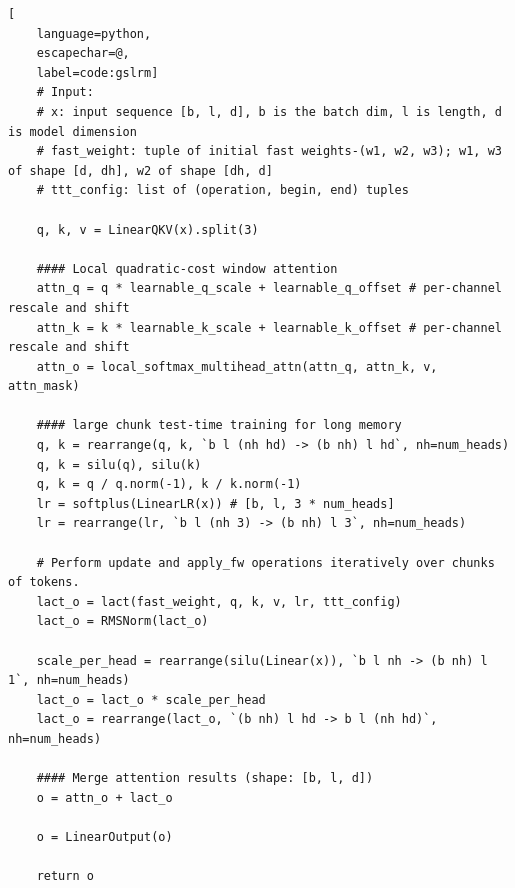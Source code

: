 \documentclass{article}
\begin{document}
\begin{algorithm}[t]

\caption{LaCT Layer with In-Layer Hybrid Window Attention Pseudocode}\label{alg:lact_hybrid}
\newcommand{\hlbox}[1]{
  \fboxsep=1.2pt\hspace*{-\fboxsep}\colorbox{blue!10}{\detokenize{#1}}
}
\lstset{style=mocov3}
\begin{lstlisting}[
    language=python,
    escapechar=@,
    label=code:gslrm]
    # Input: 
    # x: input sequence [b, l, d], b is the batch dim, l is length, d is model dimension
    # fast_weight: tuple of initial fast weights-(w1, w2, w3); w1, w3 of shape [d, dh], w2 of shape [dh, d]
    # ttt_config: list of (operation, begin, end) tuples

    q, k, v = LinearQKV(x).split(3)

    #### Local quadratic-cost window attention
    attn_q = q * learnable_q_scale + learnable_q_offset # per-channel rescale and shift
    attn_k = k * learnable_k_scale + learnable_k_offset # per-channel rescale and shift
    attn_o = local_softmax_multihead_attn(attn_q, attn_k, v, attn_mask)

    #### large chunk test-time training for long memory
    q, k = rearrange(q, k, `b l (nh hd) -> (b nh) l hd`, nh=num_heads)
    q, k = silu(q), silu(k)
    q, k = q / q.norm(-1), k / k.norm(-1)
    lr = softplus(LinearLR(x)) # [b, l, 3 * num_heads]
    lr = rearrange(lr, `b l (nh 3) -> (b nh) l 3`, nh=num_heads)

    # Perform update and apply_fw operations iteratively over chunks of tokens.
    lact_o = lact(fast_weight, q, k, v, lr, ttt_config)
    lact_o = RMSNorm(lact_o)

    scale_per_head = rearrange(silu(Linear(x)), `b l nh -> (b nh) l 1`, nh=num_heads)
    lact_o = lact_o * scale_per_head
    lact_o = rearrange(lact_o, `(b nh) l hd -> b l (nh hd)`, nh=num_heads)

    #### Merge attention results (shape: [b, l, d])
    o = attn_o + lact_o

    o = LinearOutput(o)

    return o
\end{lstlisting}
\end{algorithm}
\end{document}
